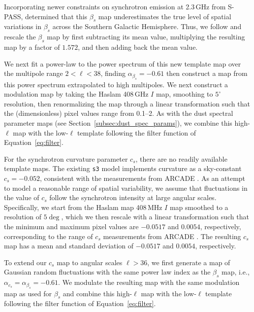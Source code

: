 \documentclass[twocolumn]{aastex631}
\begin{document}
Incorporating newer constraints on synchrotron emission at 2.3\,GHz from S-PASS, \citet{Krachmalnicoff:2018} determined that this $\beta_s$ map underestimates the true level of spatial variations in $\beta_s$ across the Southern Galactic Hemisphere. Thus, we follow \citet{Krachmalnicoff:2018} and rescale the $\beta_s$ map by first subtracting its mean value, multiplying the resulting map by a factor of $1.572$, and then adding back the mean value.

We next fit a power-law to the power spectrum of this new template map over the multipole range $2<\ell<38$, finding $\alpha_{\beta_s}=-0.61$ then construct a map from this power spectrum extrapolated to high multipoles. We next construct a modulation map by taking the Haslam 408\,GHz $I$ map, smoothing to $5^\circ$ resolution, then renormalizing the map through a linear transformation such that the (dimensionless) pixel values range from 0.1--2. As with the dust spectral parameter maps (see Section~\ref{subsec:dust_spec_params}), we combine this high-$\ell$ map with the low-$\ell$ template following the filter function of Equation~\ref{eq:filter}.
 
For the synchrotron curvature parameter $c_s$, there are no readily available template maps. The existing \texttt{s3} model implements curvature as a sky-constant $c_s = -0.052$, consistent with the measurements from ARCADE \citep[$c_s=-0.052 \pm 0.005$,][]{Kogut:2012}. As an attempt to model a reasonable range of spatial variability, we assume that fluctuations in the value of $c_s$ follow the synchrotron intensity at large angular scales. Specifically, we start from the Haslam map 408\,MHz $I$ map smoothed to a resolution of $5 \deg$, which we then rescale with a linear transformation such that the minimum and maximum pixel values are  $-0.0517$ and $0.0054$, respectively, corresponding to the range of $c_s$ measurements from ARCADE \citep{Kogut:2012}. The resulting $c_s$ map has a mean and standard deviation of $-0.0517$ and $0.0054$, respectively. 


To extend our $c_s$ map to angular scales $\ell > 36$, we first generate a map of Gaussian random fluctuations with the same power law index as the $\beta_s$ map, i.e., $\alpha _{c_s}=\alpha _{\beta_s} = -0.61$. We modulate the resulting map with the same modulation map as used for $\beta_s$ and combine this high-$\ell$ map with the low-$\ell$ template following the filter function of Equation~\ref{eq:filter}.
\end{document}
